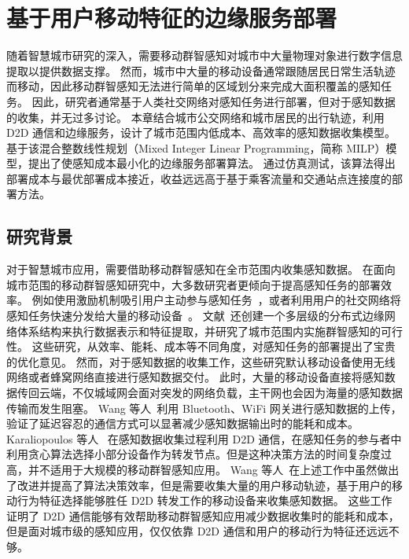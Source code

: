 \chapter{基于用户移动特征的边缘服务部署}

随着智慧城市研究的深入，需要移动群智感知对城市中大量物理对象进行数字信息提取以提供数据支撑。
然而，城市中大量的移动设备通常跟随居民日常生活轨迹而移动，因此移动群智感知无法进行简单的区域划分来完成大面积覆盖的感知任务。
因此，研究者通常基于人类社交网络对感知任务进行部署，但对于感知数据的收集，并无过多讨论。
本章结合城市公交网络和城市居民的出行轨迹，利用 D2D 通信和边缘服务，设计了城市范围内低成本、高效率的感知数据收集模型。
基于该混合整数线性规划（Mixed Integer Linear Programming，简称 MILP）模型，提出了使感知成本最小化的边缘服务部署算法。
通过仿真测试，该算法得出部署成本与最优部署成本接近，收益远远高于基于乘客流量和交通站点连接度的部署方法。

\section{研究背景}

对于智慧城市应用，需要借助移动群智感知在全市范围内收集感知数据。
在面向城市范围的移动群智感知研究中，大多数研究者更倾向于提高感知任务的部署效率。
例如使用激励机制吸引用户主动参与感知任务~\cite{CNKI:JiaChaopeng, CNKI:WuMCSIncentive, jiyubianyuanjisuangongyecaiji}，或者利用用户的社交网络将感知任务快速分发给大量的移动设备~\cite{Cnki:Yu2018}。
文献~还创建一个多层级的分布式边缘网络体系结构来执行数据表示和特征提取，并研究了城市范围内实施群智感知的可行性。
这些研究，从效率、能耗、成本等不同角度，对感知任务的部署提出了宝贵的优化意见。
然而，对于感知数据的收集工作，这些研究默认移动设备使用无线网络或者蜂窝网络直接进行感知数据交付。
此时，大量的移动设备直接将感知数据传回云端，不仅城域网会面对突发的网络负载，主干网也会因为海量的感知数据传输而发生阻塞。
Wang 等人~\cite{DBLP:conf/huc/WangZX13}利用 Bluetooth、WiFi 网关进行感知数据的上传，验证了延迟容忍的通信方式可以显著减少感知数据输出时的能耗和成本。
Karaliopoulos 等人~\cite{DBLP:conf/infocom/KaraliopoulosTK15} 在感知数据收集过程利用 D2D 通信，在感知任务的参与者中利用贪心算法选择小部分设备作为转发节点。但是这种决策方法的时间复杂度过高，并不适用于大规模的移动群智感知应用。
Wang 等人~\cite{DBLP:journals/puc/WangLL17}在上述工作中虽然做出了改进并提高了算法决策效率，但是需要收集大量的用户移动轨迹，基于用户的移动行为特征选择能够胜任 D2D 转发工作的移动设备来收集感知数据。
这些工作证明了 D2D 通信能够有效帮助移动群智感知应用减少数据收集时的能耗和成本，但是面对城市级的感知应用，仅仅依靠 D2D 通信和用户的移动行为特征还远远不够。

